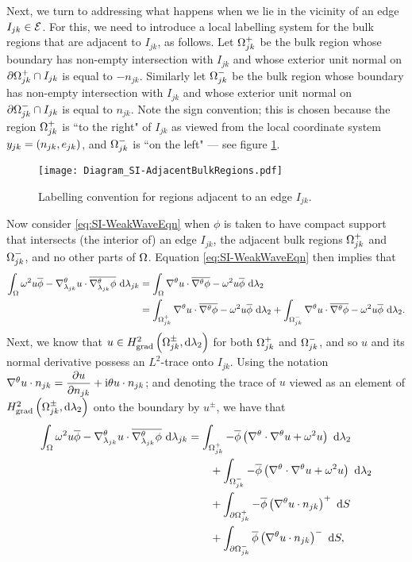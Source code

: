 Next, we turn to addressing what happens when we lie in the vicinity of an edge $I_{jk}\in\mathcal{E}$.
For this, we need to introduce a local labelling system for the bulk regions that are adjacent to $I_{jk}$, as follows.
Let $\Omega_{jk}^+$ be the bulk region whose boundary has non-empty intersection with $I_{jk}$ and whose exterior unit normal on $\partial\Omega_{jk}^+\cap I_{jk}$ is equal to $-n_{jk}$.
Similarly let $\Omega_{jk}^-$ be the bulk region whose boundary has non-empty intersection with $I_{jk}$ and whose exterior unit normal on $\partial\Omega_{jk}^-\cap I_{jk}$ is equal to $n_{jk}$.
Note the sign convention; this is chosen because the region $\Omega_{jk}^+$ is ``to the right" of $I_{jk}$ as viewed from the local coordinate system $y_{jk}=\left( n_{jk}, e_{jk} \right)$, and $\Omega_{jk}^-$ is ``on the left" --- see figure \ref{fig:Diagram_SI-AdjacentBulkRegions}.
\begin{figure}[h]
	\centering
	\texttt{[image: Diagram\_SI-AdjacentBulkRegions.pdf]}
	\caption{\label{fig:Diagram_SI-AdjacentBulkRegions} Labelling convention for regions adjacent to an edge $I_{jk}$.}
\end{figure}
Now consider \eqref{eq:SI-WeakWaveEqn} when $\phi$ is taken to have compact support that intersects (the interior of) an edge $I_{jk}$, the adjacent bulk regions $\Omega_{jk}^+$ and $\Omega_{jk}^-$, and no other parts of $\Omega$.
Equation \eqref{eq:SI-WeakWaveEqn} then implies that
\begin{align*}
	\int_{\Omega} \omega^2 u\overline{\phi} - \nabla^{\theta}_{\lambda_{jk}}u\cdot\overline{\nabla^{\theta}_{\lambda_{jk}}\phi}  \ \mathrm{d}\lambda_{jk}
	&= \int_{\Omega} \nabla^{\theta} u\cdot\overline{\nabla^{\theta}\phi} - \omega^2 u\overline{\phi}  \ \mathrm{d}\lambda_2 \\
	&= \int_{\Omega_{jk}^+} \nabla^{\theta} u\cdot\overline{\nabla^{\theta}\phi} - \omega^2 u\overline{\phi}  \ \mathrm{d}\lambda_2
	+ \int_{\Omega_{jk}^-} \nabla^{\theta} u\cdot\overline{\nabla^{\theta}\phi} - \omega^2 u\overline{\phi}  \ \mathrm{d}\lambda_2.
\end{align*}
Next, we know that $u\in H^2_\mathrm{grad}\left( \Omega_{jk}^{\pm}, \mathrm{d}\lambda_2 \right)$ for both $\Omega_{jk}^+$ and $\Omega_{jk}^-$, and so $u$ and its normal derivative possess an $L^2$-trace onto $I_{jk}$.
Using the notation $\nabla^{\theta} u\cdot n_{jk} = \dfrac{\partial u}{\partial n_{jk}} + \mathrm{i}\theta u\cdot n_{jk}$; and denoting the trace of $u$ viewed as an element of $H^2_\mathrm{grad}\left( \Omega_{jk}^{\pm}, \mathrm{d}\lambda_2 \right)$ onto the boundary by $u^{\pm}$, we have that
\begin{align*}
	\int_{\Omega} \omega^2 u\overline{\phi} - \nabla^{\theta}_{\lambda_{jk}}u\cdot\overline{\nabla^{\theta}_{\lambda_{jk}}\phi}  \ \mathrm{d}\lambda_{jk}
	&= \int_{\Omega_{jk}^+} -\overline{\phi}\left(  \nabla^{\theta}\cdot\nabla^{\theta} u + \omega^2 u  \right)  \ \mathrm{d}\lambda_2 \\
	&\qquad + \int_{\Omega_{jk}^-} -\overline{\phi}\left(  \nabla^{\theta}\cdot\nabla^{\theta} u + \omega^2 u  \right)  \ \mathrm{d}\lambda_2 \\
	&\qquad + \int_{\partial\Omega_{jk}^+} -\overline{\phi}\left( \nabla^{\theta} u\cdot n_{jk} \right)^{+}  \ \mathrm{d}S \\
	&\qquad + \int_{\partial\Omega_{jk}^-} \overline{\phi}\left( \nabla^{\theta} u\cdot n_{jk} \right)^{-}  \ \mathrm{d}S,
\end{align*}

